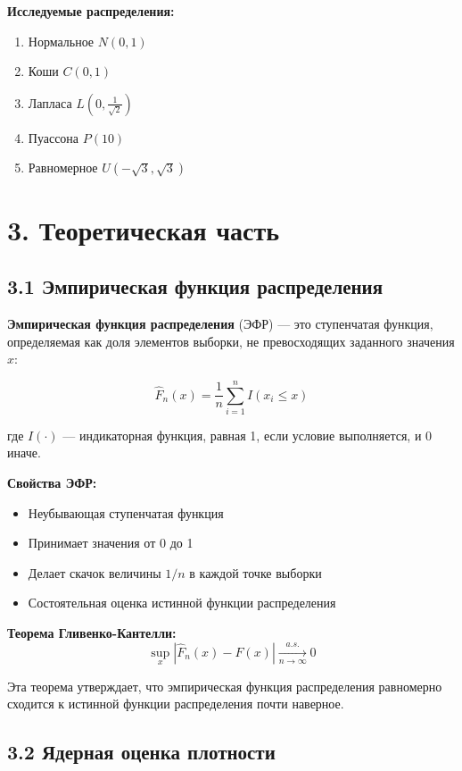 \documentclass[a4paper,14pt]{extarticle}
\begin{document}
\textbf{Исследуемые распределения:}
\begin{enumerate}
    \item Нормальное $N(0, 1)$
    \item Коши $C(0, 1)$
    \item Лапласа $L(0, \frac{1}{\sqrt{2}})$
    \item Пуассона $P(10)$
    \item Равномерное $U(-\sqrt{3}, \sqrt{3})$
\end{enumerate}

\section*{3. Теоретическая часть}

\subsection*{3.1 Эмпирическая функция распределения}

\textbf{Эмпирическая функция распределения} (ЭФР) — это ступенчатая функция, определяемая как доля элементов выборки, не превосходящих заданного значения $x$:

\begin{equation}
\hat{F}_n(x) = \frac{1}{n} \sum_{i=1}^{n} I(x_i \leq x)
\end{equation}

где $I(\cdot)$ — индикаторная функция, равная 1, если условие выполняется, и 0 иначе.

\textbf{Свойства ЭФР:}
\begin{itemize}
    \item Неубывающая ступенчатая функция
    \item Принимает значения от 0 до 1
    \item Делает скачок величины $1/n$ в каждой точке выборки
    \item Состоятельная оценка истинной функции распределения
\end{itemize}

\textbf{Теорема Гливенко-Кантелли:}
\begin{equation}
\sup_{x} |\hat{F}_n(x) - F(x)| \xrightarrow[n \to \infty]{a.s.} 0
\end{equation}

Эта теорема утверждает, что эмпирическая функция распределения равномерно сходится к истинной функции распределения почти наверное.

\subsection*{3.2 Ядерная оценка плотности}
\end{document}
